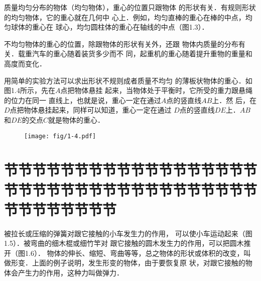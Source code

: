     质量均匀分布的物体（均匀物体），重心的位置只跟物体
的形状有关．有规则形状的均匀物体，它的重心就在几何中
心上．例如，均匀直棒的重心在棒的中点，均匀球体的重心在
球心，均匀圆柱体的重心在轴线的中点（图1.3）．

 \begin{figure}[htp]\centering
{}
\caption{}
 \end{figure}

    不均匀物体的重心的位置，除跟物体的形状有关外，还跟
物体内质量的分布有关．载重汽车的重心随着装货多少而不
同，起重机的重心随着提升重物的重量和高度而变化．

    用简单的实验方法可以求出形状不规则成者质量不均匀
的薄板状物体的重心．如图1.4所示，先在$A$点把物体悬挂
起来，当物体处于平衡时，它所受的重力跟悬绳的位力在同一
直线上，也就是说，重心一定在通过$A$点的竖直线$AB$上．然
后，在$D$点把物体悬挂起来，同样可以知道，重心一定在通过
$D$点的竖直线$DE$上．$AB$和$DE$的交点$C$就是物体的重心．


\begin{figure}[htp]
\centering
\texttt{[image: fig/1-4.pdf]}
\caption{}
\end{figure}

\section{节节节节节节节节节节节节节节节节节节节节节节节节节节节节节节节节节节节节节节节节节节节节}

被拉长或压缩的弹簧对跟它接触的小车发生力的作用，
可以使小车运动起来（图1.5）．被弯曲的细木棍或细竹竿对
跟它接触的圆木发生力的作用，可以把圆木推开（图1.6）．
物体的伸长、缩短、弯曲等等，总之物体的形状或体积的改变，叫
做形变．上面的例子说明，发生形变的物体，由于要恢复原
状，对跟它接触的物体会产生力的作用，这种力叫做\textsf{弹力}．


